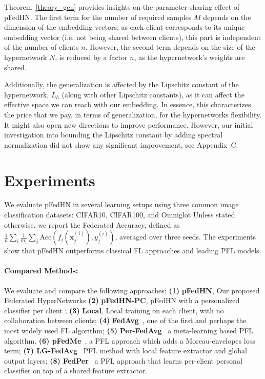 \documentclass{article}
\newcommand{\bx}{\boldsymbol{x}}
\newcommand\ourmethod{pFedHN}
\begin{document}
Theorem~\ref{theory_gen} provides insights on the parameter-sharing effect of \ourmethod{}. The first term for the number of required samples $M$ depends on the dimension of the embedding vectors; as each client corresponds to its unique embedding vector (i.e. not being shared between clients), this part is independent of the number of clients $n$. 
However, the second term depends on the size of the hypernetwork $N$, is reduced by a factor $n$, as the hypernetwork's weights are shared.



Additionally, the generalization is affected by the Lipschitz constant of the hypernetwork, $L_h$ (along with other Lipschitz constants), as it can affect the effective space we can reach with our embedding. In essence, this characterizes the price that we pay, in terms of generalization, for the hypernetworks flexibility. It might also open new directions to improve performance. However, our initial investigation into bounding the Lipschitz constant by adding spectral normalization \cite{spectral_normalization} did not show any significant improvement, see Appendix~C.





\section{Experiments}\label{sec:experiments}



We evaluate \ourmethod{} in several learning setups using three common image classification datasets:  CIFAR10, CIFAR100, and Omniglot \citep{cifar, lake2015human} Unless stated otherwise, we report the Federated Accuracy, defined as   $\frac{1}{n}\sum_i\frac{1}{m_i}\sum_j \text{Acc}\left(f_i\left(\bx^{(i)}_j\right), y^{(i)}_j\right)$, averaged over three seeds.
The experiments show that \ourmethod{} outperforms classical FL approaches and leading PFL models. 


\paragraph{Compared Methods:} We evaluate and compare the following approaches: \textbf{(1)} \textbf{\ourmethod{}}, Our proposed Federated HyperNetworks  \textbf{(2)} \textbf{\ourmethod{}-PC}, \ourmethod{} with a personalized classifier per client ; 
\textbf{(3)} \textbf{Local}, Local training on each client, with no collaboration between clients;
\textbf{(4)} \textbf{FedAvg}~\cite{McMahan2017CommunicationEfficientLO}, one of the first and perhaps the most widely used FL algorithm;
\textbf{(5)} \textbf{Per-FedAvg}~\cite{Fallah2020PersonalizedFL} a meta-learning based PFL algorithm.
 \textbf{(6) pFedMe}~\cite{Dinh2020PersonalizedFL}, a PFL approach which adds a Moreau-envelopes loss term; \textbf{(7) LG-FedAvg}~\cite{liang2020think} PFL method with local feature extractor and global output layers; \textbf{(8) FedPer}~\cite{arivazhagan2019federated} a PFL approach that learns per-client personal classifier on top of a shared feature extractor.
\end{document}
